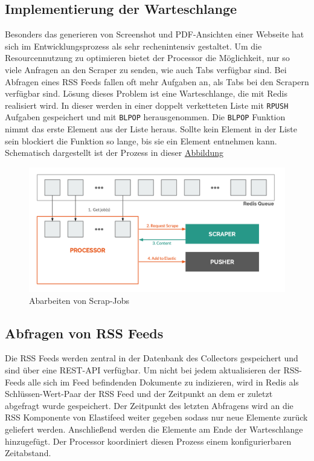\subsection{Implementierung der Warteschlange}

Besonders das generieren von Screenshot und PDF-Ansichten einer Webseite hat sich im Entwicklungsprozess als sehr rechenintensiv gestaltet.
Um die Resourcennutzung zu optimieren bietet der Processor die Möglichkeit, nur so viele Anfragen an den Scraper zu senden, wie auch Tabs verfügbar sind.
Bei Abfragen eines RSS Feeds fallen oft mehr Aufgaben an, als Tabs bei den Scrapern verfügbar sind.
Lösung dieses Problem ist eine Warteschlange, die mit Redis \cite{redis} realisiert wird.
In dieser werden in einer doppelt verketteten Liste mit \texttt{RPUSH} Aufgaben gespeichert und mit \texttt{BLPOP} herausgenommen.
Die \texttt{BLPOP} Funktion nimmt das erste Element aus der Liste heraus.
Sollte kein Element in der Liste sein blockiert die Funktion so lange, bis sie ein Element entnehmen kann.
Schematisch dargestellt ist der Prozess in dieser \hyperref[processor:image:processor]{Abbildung}

\begin{figure}[t]
  \centering
  \includegraphics[width=\linewidth]{images/processor.png}
  \caption{Abarbeiten von Scrap-Jobs}
  \label{processor:image:processor}
\end{figure}


\subsection{Abfragen von RSS Feeds}
Die RSS Feeds werden zentral in der Datenbank des Collectors gespeichert und sind über eine REST-API verfügbar.
Um nicht bei jedem aktualisieren der RSS-Feeds alle sich im Feed befindenden Dokumente zu indizieren, wird in Redis als Schlüssen-Wert-Paar der RSS Feed und der Zeitpunkt an dem er zuletzt abgefragt wurde gespeichert.
Der Zeitpunkt des letzten Abfragens wird an die RSS Komponente von Elastifeed weiter gegeben sodass nur neue Elemente zurück geliefert werden.
Anschließend werden die Elemente am Ende der Warteschlange hinzugefügt.
Der Processor koordiniert diesen Prozess einem konfigurierbaren Zeitabstand.

